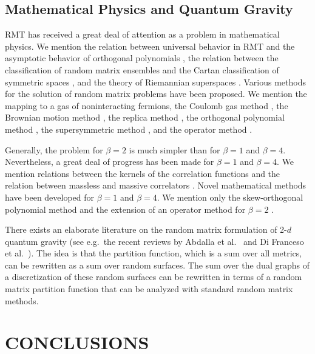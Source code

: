 \subsection{Mathematical Physics and Quantum Gravity}

RMT has received a great deal of attention as a
problem in mathematical physics. We mention the relation between
universal behavior in RMT and the asymptotic behavior of orthogonal
polynomials \cite{Fox64,nagao,Brez93,Eynard,Deo}, the relation between
the classification of random matrix ensembles and the Cartan
classification of symmetric spaces \cite{class}, and the theory of
Riemannian superspaces \cite{class}.  Various methods for the
solution of random matrix problems have been proposed. We mention the
mapping to a gas of noninteracting fermions, the Coulomb gas method
\cite{Dyso62}, the Brownian motion method \cite{Dyso62}, the replica
method \cite{edwards}, the orthogonal polynomial method \cite{Mehta},
the supersymmetric method \cite{Efetov}, and the operator method
\cite{Ginsparg}.

Generally, the problem for $\beta=2$ is much simpler than for $\beta
=1$ and $\beta =4$. Nevertheless, a great deal of progress has been
made for $\beta =1$ and $\beta =4$. We mention relations between the
kernels of the correlation functions
\cite{Verb94,Naga95,Sene98,Wido98} and the relation between massless
and massive correlators \cite{akemann-kanzieper}.  Novel mathematical
methods have been developed for $\beta =1$ and $\beta =4$.  We 
mention only the skew-orthogonal polynomial method
\cite{Dyson-skew,Mehtaskew,nagao,Verb94} and the extension of an
operator method for $\beta =2$ \cite{brezinneuberger,tracysk,Sene98}.

There exists an elaborate literature on the random matrix formulation
of 2-$d$ quantum gravity (see e.g.\ the recent reviews by Abdalla et
al.~\cite{Dalmazi} and Di Franceso et al.~\cite{Ginsparg}). The idea
is that the partition function, which is a 
sum over all metrics, can be rewritten as a sum over random surfaces.
The sum over the dual graphs of a discretization of these random
surfaces can be rewritten in terms of a random matrix partition
function that can be analyzed with standard random matrix methods.


\section{CONCLUSIONS}


